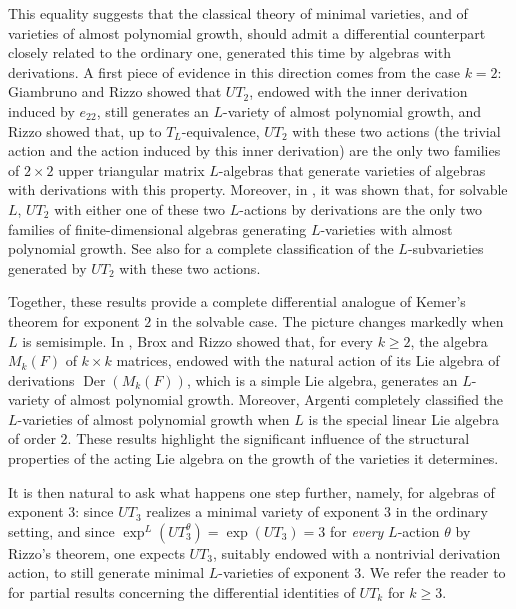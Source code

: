 \documentclass[a4paper,reqno]{amsart}
\theoremstyle{definition}
\numberwithin{equation}{section}
\numberwithin{theorem}{section}
\DeclareMathOperator{\D}{Der}
\begin{document}
This equality suggests that the classical theory of minimal varieties, and of varieties of
almost polynomial growth, should admit a differential counterpart closely related to the ordinary one, generated this time by
algebras with derivations. A first piece of evidence in this direction comes from the case $k=2$: Giambruno
and Rizzo \cite{GiambrunoRizzo2019} showed that $UT_2$, endowed with the inner derivation
induced by $e_{22}$, still generates an $L$-variety of almost polynomial growth, and Rizzo
\cite{Rizzo2021} showed that, up to $T_L$-equivalence, $UT_2$ with these two actions (the trivial action and the action induced by this inner derivation) are  the only two families of  $2\times2$ upper triangular matrix $L$-algebras that generate varieties of algebras with derivations with this property. Moreover, in \cite{Rizzo2023}, it was shown that, for solvable $L$, $UT_2$ with either one of these two $L$-actions by derivations are the only two families of finite-dimensional algebras generating $L$-varieties with almost polynomial growth.  See also \cite{MartinoRizzo2022} for a complete classification of the $L$-subvarieties generated by $UT_2$ with these two actions. 


Together, these results provide a complete differential analogue of Kemer's theorem for exponent $2$ in the solvable case. The picture changes markedly when $L$ is semisimple.  In \cite{BroxRizzo2024}, Brox and Rizzo showed that, for every $k\geq 2$, the algebra $M_k(F)$ of $k\times k$ matrices, endowed with the natural action of its Lie algebra of derivations $\D(M_k(F))$, which is a simple Lie algebra, generates an $L$-variety of almost polynomial growth. Moreover, Argenti \cite{Argenti2024} completely classified the $L$-varieties of almost polynomial growth when $L$ is the special linear Lie algebra of order $2$. These results highlight the significant influence of the structural properties of the acting Lie algebra on the growth of the varieties it determines. 


It is then natural to ask what happens one step further, namely, for algebras of exponent $3$: since
$UT_3$ realizes a minimal variety of exponent $3$
in the ordinary setting, and since $\exp^L(UT_3^\theta)=\exp(UT_3)=3$ for \emph{every}
$L$-action $\theta$ by Rizzo's theorem, one expects $UT_3$, suitably endowed with a nontrivial
derivation action, to still generate minimal $L$-varieties of exponent $3$. We refer the reader to \cite{DiVincenzoNardozza2021,Nardozza2023} for partial results concerning the differential identities of $UT_k$ for $k\geq 3$.
\end{document}
